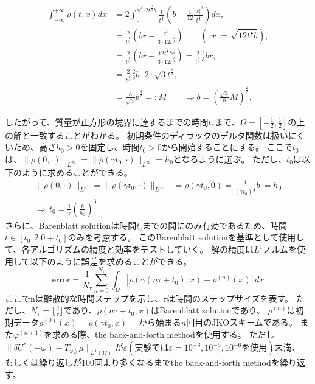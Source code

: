 \begin{align*}
    \int^{+\infty}_{-\infty} \rho(t, x)dx &= 2 \int^{\sqrt{12t^{\frac{2}{3}}b}}_0 \frac{1}{t^{\frac{1}{3}}}\left(b - \frac{1}{12} \frac{|x|^2}{t^{\frac{2}{3}}}\right)dx,\\
                                            &= \frac{2}{t^{\frac{1}{3}}}\left(b r - \frac{r^3}{3 \cdot 12 t^{\frac{2}{3}}}\right) \qquad \left(\because r := \sqrt{12t^{\frac{2}{3}}b}\right),\\
                                            &= \frac{2}{t^{\frac{1}{3}}}\left(b r - \frac{12t^{\frac{2}{3}}b r}{3 \cdot 12 t^{\frac{2}{3}}}\right) = \frac{2}{t^{\frac{1}{3}}}\frac{2}{3}br,\\
                                            &= \frac{2}{t^{\frac{1}{3}}}\frac{2}{3}b \cdot 2\cdot \sqrt{3} t^{\frac{1}{3}},\\
                                            &= \frac{8}{\sqrt{3}}b^{\frac{3}{2}} =: M  \qquad \Longrightarrow b = \left(\frac{\sqrt{3}}{8} M \right)^{\frac{2}{3}}.
\end{align*}



したがって、質量が正方形の境界に達するまでの時間$t_c$まで、$\Omega = [- \frac{1}{2}, \frac{1}{2}]$の上の解と一致することがわかる。
初期条件のディラックのデルタ関数は扱いにくいため、高さ$h_0 > 0$を固定し、時間$t_0 > 0$から開始することにする。
ここで$t_0$は、$\|\rho(0, \cdot)\|_{L^\infty}= \|\overline{\rho} (\gamma t_0, \cdot)\|_{L^\infty} = h_0$となるように選ぶ。
ただし、$t_0$は以下のように求めることができる。
\begin{align*}
    \|\rho(0, \cdot)\|_{L^\infty} = \|\overline{\rho} (\gamma t_0, \cdot)\|_{L^\infty} &= \overline{\rho}(\gamma t_0, 0) = \frac{1}{(\gamma t_{0})^{\frac{1}{3}}} b\ = h_0\\
    \Longrightarrow \, t_0 = \frac{1}{\gamma}\left(\frac{b}{h_0}\right)^3
\end{align*}
さらに、Barenblatt solutionは時間$t_c$までの間にのみ有効であるため、時間$t \in [t_0, 2.0+t_0]$のみを考慮する。
このBarenblatt solutionを基準として使用して、各アルゴリズムの精度と効率をテストしていく。
解の精度は$L^1$ノルムを使用して以下のように誤差を求めることができる。
\begin{equation}
    \label{eq:error}
    \text{error} = \frac{1}{N_\tau} \sum_{n = 0}^{N_\tau} \int_\Omega |\overline{\rho}(\gamma(n \tau + t_0), x) - \overline{\rho}^{(n)}(x)|\, dx
\end{equation}
ここでnは離散的な時間ステップを示し、$\tau$は時間のステップサイズを表す。
ただし、$N_\tau = \lfloor \frac{2}{\tau} \rfloor$であり、$\overline{\rho}(n\tau + t_0, x)$はBarenblatt solutionであり、
$\overline{\rho}^{(n)}$は初期データ$\overline{\rho}^{(0)}(x) = \overline{\rho}(\gamma t_0, x) = $から始まる$n$回目のJKOスキームである。
また$\varphi^{(n+1)}$を求める際、the back-and-forth methodを使用する。
ただし$\|\delta U^*(- \varphi) - T_{\varphi \#} \mu \|_{L^1(\Omega)}$が$\varepsilon (\text{実験では}\varepsilon = 10^{-3}, 10^{-5}, 10^{-6}\text{を使用})$未満、
もしくは繰り返しが100回より多くなるまでthe back-and-forth methodを繰り返す。

